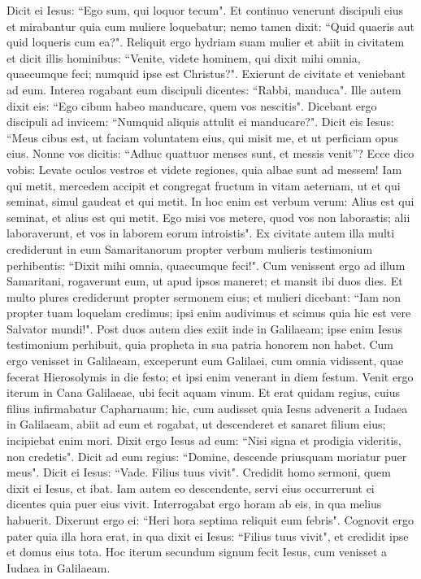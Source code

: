 \begin{biblechapter}
\verse Dicit ei Iesus: “Ego sum, qui loquor tecum". 
\verse Et continuo venerunt discipuli eius et mirabantur quia cum muliere loquebatur; nemo tamen dixit: “Quid quaeris aut quid loqueris cum ea?". 
\verse Reliquit ergo hydriam suam mulier et abiit in civitatem et dicit illis hominibus: 
\verse “Venite, videte hominem, qui dixit mihi omnia, quaecumque feci; numquid ipse est Christus?". 
\verse Exierunt de civitate et veniebant ad eum. 
\verse Interea rogabant eum discipuli dicentes: “Rabbi, manduca". 
\verse Ille autem dixit eis: “Ego cibum habeo manducare, quem vos nescitis". 
\verse Dicebant ergo discipuli ad invicem: “Numquid aliquis attulit ei manducare?".  
\verse Dicit eis Iesus: “Meus cibus est, ut faciam voluntatem eius, qui misit me, et ut perficiam opus eius. 
\verse Nonne vos dicitis: “Adhuc quattuor menses sunt, et messis venit”? Ecce dico vobis: Levate oculos vestros et videte regiones, quia albae sunt ad messem! Iam 
\verse qui metit, mercedem accipit et congregat fructum in vitam aeternam, ut et qui seminat, simul gaudeat et qui metit. 
\verse In hoc enim est verbum verum: Alius est qui seminat, et alius est qui metit. 
\verse Ego misi vos metere, quod vos non laborastis; alii laboraverunt, et vos in laborem eorum introistis". 
\verse Ex civitate autem illa multi crediderunt in eum Samaritanorum propter verbum mulieris testimonium perhibentis: “Dixit mihi omnia, quaecumque feci!". 
\verse Cum venissent ergo ad illum Samaritani, rogaverunt eum, ut apud ipsos maneret; et mansit ibi duos dies. 
\verse Et multo plures crediderunt propter sermonem eius; 
\verse et mulieri dicebant: “Iam non propter tuam loquelam credimus; ipsi enim audivimus et scimus quia hic est vere Salvator mundi!". 
\verse Post duos autem dies exiit inde in Galilaeam; 
\verse ipse enim Iesus testimonium perhibuit, quia propheta in sua patria honorem non habet. 
\verse Cum ergo venisset in Galilaeam, exceperunt eum Galilaei, cum omnia vidissent, quae fecerat Hierosolymis in die festo; et ipsi enim venerant in diem festum. 
\verse Venit ergo iterum in Cana Galilaeae, ubi fecit aquam vinum. Et erat quidam regius, cuius filius infirmabatur Capharnaum; 
\verse hic, cum audisset quia Iesus advenerit a Iudaea in Galilaeam, abiit ad eum et rogabat, ut descenderet et sanaret filium eius; incipiebat enim mori. 
\verse Dixit ergo Iesus ad eum: “Nisi signa et prodigia videritis, non credetis". 
\verse Dicit ad eum regius: “Domine, descende priusquam moriatur puer meus". 
\verse Dicit ei Iesus: “Vade. Filius tuus vivit". Credidit homo sermoni, quem dixit ei Iesus, et ibat. 
\verse Iam autem eo descendente, servi eius occurrerunt ei dicentes quia puer eius vivit. 
\verse Interrogabat ergo horam ab eis, in qua melius habuerit. Dixerunt ergo ei: “Heri hora septima reliquit eum febris". 
\verse Cognovit ergo pater quia illa hora erat, in qua dixit ei Iesus: “Filius tuus vivit", et credidit ipse et domus eius tota. 
\verse Hoc iterum secundum signum fecit Iesus, cum venisset a Iudaea in Galilaeam. 
\end{biblechapter}

